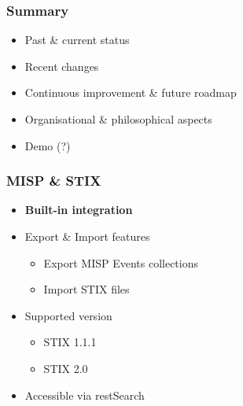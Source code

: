 
\begin{frame}[t,plain]
\titlepage
\end{frame}

\begin{frame}
    \frametitle{Summary}
    \begin{itemize}
        \item Past \& current status
        \item Recent changes
        \item Continuous improvement \& future roadmap
        \item Organisational \& philosophical aspects
        \item Demo (?)
    \end{itemize}
\end{frame}

\begin{frame}
    \frametitle{MISP \& STIX}
    \begin{itemize}
        \item{\bf Built-in integration}
        \item Export \& Import features
        \begin{itemize}
            \item Export MISP Events collections
            \item Import STIX files
        \end{itemize}
        \item Supported version
        \begin{itemize}
            \item STIX 1.1.1
            \item STIX 2.0
        \end{itemize}
        \item Accessible via restSearch
    \end{itemize}
\end{frame}

